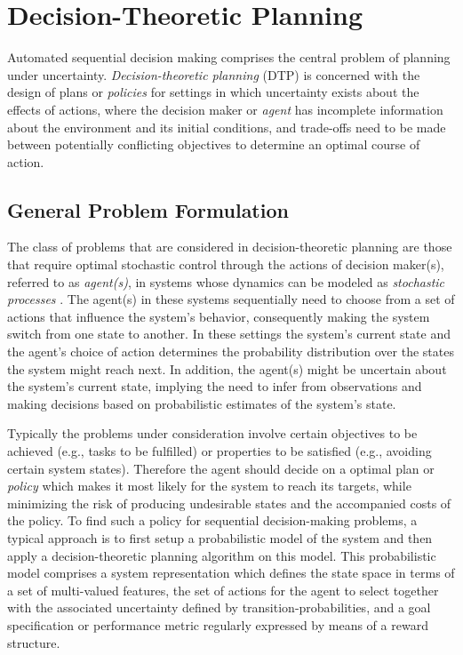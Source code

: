 \chapter{Decision-Theoretic Planning}
\label{ch:background}
Automated sequential decision making comprises the central problem of planning under uncertainty. 
\textit{Decision-theoretic planning} (DTP) is concerned with the design of plans or \textit{policies} for settings in which uncertainty exists about the effects of actions, where the decision maker or \textit{agent} has incomplete information about the environment and its initial conditions, and trade-offs need to be made between potentially conflicting objectives to determine an optimal course of action.

\section{General Problem Formulation}
\label{sec:problem-formulation}

The class of problems that are considered in decision-theoretic planning are those that require optimal stochastic control through the actions of decision maker(s), referred to as \textit{agent(s)}, in systems whose dynamics can be modeled as \textit{stochastic processes} \cite{Boutilier1999}.
The agent(s) in these systems sequentially need to choose from a set of actions that influence the system's behavior, consequently making the system switch from one state to another.
In these settings the system's current state and the agent's choice of action determines the probability distribution over the states the system might reach next.
In addition, the agent(s) might be uncertain about the system's current state, implying the need to infer from observations and making decisions based on probabilistic estimates of the system's state.

Typically the problems under consideration involve certain objectives to be achieved (e.g., tasks to be fulfilled) or properties to be satisfied (e.g., avoiding certain system states). 
Therefore the agent should decide on a optimal plan or \textit{policy} which makes it most likely for the system to reach its targets, while minimizing the risk of producing undesirable states and the accompanied costs of the policy.
To find such a policy for sequential decision-making problems, a typical approach is to first setup a probabilistic model of the system and then apply a decision-theoretic planning algorithm on this model.
This probabilistic model comprises a system representation which defines the state space in terms of a set of multi-valued features, the set of actions for the agent to select together with the associated uncertainty defined by transition-probabilities, and a goal specification or performance metric regularly expressed by means of a reward structure.

